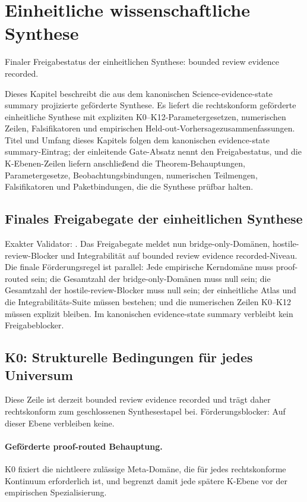 \section{Einheitliche wissenschaftliche Synthese}
\label{sec:oc-core-1-3-unified-synthesis}
Finaler Freigabestatus der einheitlichen Synthese: bounded review evidence recorded.

Dieses Kapitel beschreibt die aus dem kanonischen Science-evidence-state summary projizierte geförderte Synthese. Es liefert die rechtskonform geförderte einheitliche Synthese mit expliziten K0--K12-Parametergesetzen, numerischen Zeilen, Falsifikatoren und empirischen Held-out-Vorhersagezusammenfassungen.
Titel und Umfang dieses Kapitels folgen dem kanonischen evidence-state summary-Eintrag; der einleitende Gate-Absatz nennt den Freigabestatus, und die K-Ebenen-Zeilen liefern anschließend die Theorem-Behauptungen, Parametergesetze, Beobachtungsbindungen, numerischen Teilmengen, Falsifikatoren und Paketbindungen, die die Synthese prüfbar halten.

\subsection{Finales Freigabegate der einheitlichen Synthese}
Exakter Validator: .
Das Freigabegate meldet nun  bridge-only-Domänen,  hostile-review-Blocker und Integrabilität auf bounded review evidence recorded-Niveau.
Die finale Förderungsregel ist parallel: Jede empirische Kerndomäne muss proof-routed sein; die Gesamtzahl der bridge-only-Domänen muss null sein; die Gesamtzahl der hostile-review-Blocker muss null sein; der einheitliche Atlas und die Integrabilitäts-Suite müssen bestehen; und die numerischen Zeilen K0--K12 müssen explizit bleiben.
Im kanonischen evidence-state summary verbleibt kein Freigabeblocker.

\subsection{K0: Strukturelle Bedingungen für jedes Universum}
\label{sec:oc-core-1-3-synthesis-k0}
Diese Zeile ist derzeit bounded review evidence recorded und trägt daher rechtskonform zum geschlossenen Synthesestapel bei.
Förderungsblocker: Auf dieser Ebene verbleiben keine.

\paragraph{Geförderte proof-routed Behauptung.}
K0 fixiert die nichtleere zulässige Meta-Domäne, die für jedes rechtskonforme Kontinuum erforderlich ist, und begrenzt damit jede spätere K-Ebene vor der empirischen Spezialisierung.


